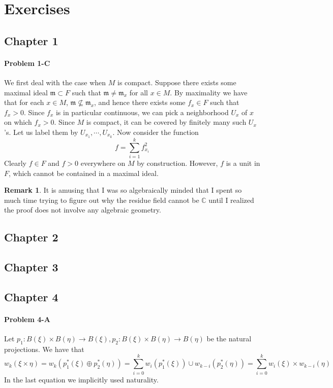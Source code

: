 \documentclass[12pt]{article}
\theoremstyle{plain}
\theoremstyle{definition}
\newtheorem{remark}[equation]{Remark}
\newcommand{\IC}{\mathbb{C}}
\newcommand{\<}{\langle}
\renewcommand{\>}{\rangle}
\newcommand{\fm}{\mathfrak{m}}
\begin{document}
\section{Exercises}
\subsection*{Chapter 1}

\paragraph{Problem 1-C} We first deal with the case when $M$ is compact. Suppose there exists some maximal ideal $\fm \subset F$ such that $\fm \neq \fm_x$ for all $x \in M$. By maximality we have that for each $x \in M$, $\fm \not\subseteq \fm_x$, and hence there exists some $f_x \in F$ such that $f_x > 0$. Since $f_x$ is in particular continuous, we can pick a neighborhood $U_x$ of $x$ on which $f_x > 0$. Since $M$ is compact, it can be covered by finitely many such $U_x$'s. Let us label them by $U_{x_1}, \cdots, U_{x_k}$. Now consider the function $$f = \sum_{i = 1}^k f_{x_i}^2 $$
Clearly $f \in F$ and $f > 0$ everywhere on $M$ by construction. However, $f$ is a unit in $F$, which cannot be contained in a maximal ideal. 
\begin{remark}
It is amusing that I was so algebraically minded that I spent so much time trying to figure out why the residue field cannot be $\IC$ until I realized the proof does not involve any algebraic geometry. 
\end{remark}


\subsection*{Chapter 2}
\subsection*{Chapter 3}
\subsection*{Chapter 4}
\paragraph{Problem 4-A} Let $p_1 : B(\xi) \times B(\eta) \to B(\xi), p_2 : B(\xi) \times B(\eta) \to B(\eta)$ be the natural projections. We have that 
$$ w_k(\xi \times \eta) = w_k( p_1^*(\xi) \oplus p_2^*(\eta)) = \sum_{i = 0}^k w_i(p_1^*(\xi)) \cup w_{k-i}(p_2^*(\eta)) = \sum_{i = 0}^k w_i(\xi) \times w_{k - i}(\eta)$$
In the last equation we implicitly used naturality. 
\end{document}
